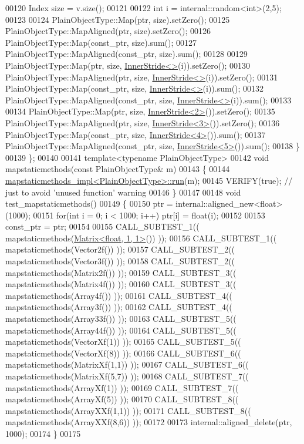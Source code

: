 \begin{DoxyCode}
00120     Index size = v.size();
00121 
00122     \textcolor{keywordtype}{int} i = internal::random<int>(2,5);
00123 
00124     PlainObjectType::Map(ptr, size).setZero();
00125     PlainObjectType::MapAligned(ptr, size).setZero();
00126     PlainObjectType::Map(const\_ptr, size).sum();
00127     PlainObjectType::MapAligned(const\_ptr, size).sum();
00128 
00129     PlainObjectType::Map(ptr, size, \hyperlink{class_eigen_1_1_inner_stride}{InnerStride<>}(i)).setZero();
00130     PlainObjectType::MapAligned(ptr, size, \hyperlink{class_eigen_1_1_inner_stride}{InnerStride<>}(i)).setZero();
00131     PlainObjectType::Map(const\_ptr, size, \hyperlink{class_eigen_1_1_inner_stride}{InnerStride<>}(i)).sum();
00132     PlainObjectType::MapAligned(const\_ptr, size, \hyperlink{class_eigen_1_1_inner_stride}{InnerStride<>}(i)).sum();
00133 
00134     PlainObjectType::Map(ptr, size, \hyperlink{class_eigen_1_1_inner_stride}{InnerStride<2>}()).setZero();
00135     PlainObjectType::MapAligned(ptr, size, \hyperlink{class_eigen_1_1_inner_stride}{InnerStride<3>}()).setZero();
00136     PlainObjectType::Map(const\_ptr, size, \hyperlink{class_eigen_1_1_inner_stride}{InnerStride<4>}()).sum();
00137     PlainObjectType::MapAligned(const\_ptr, size, \hyperlink{class_eigen_1_1_inner_stride}{InnerStride<5>}()).sum();
00138   \}
00139 \};
00140 
00141 \textcolor{keyword}{template}<\textcolor{keyword}{typename} PlainObjectType>
00142 \textcolor{keywordtype}{void} mapstaticmethods(\textcolor{keyword}{const} PlainObjectType& m)
00143 \{
00144   \hyperlink{structmapstaticmethods__impl}{mapstaticmethods\_impl<PlainObjectType>::run}(m);
00145   VERIFY(\textcolor{keyword}{true}); \textcolor{comment}{// just to avoid 'unused function' warning}
00146 \}
00147 
00148 \textcolor{keywordtype}{void} test\_mapstaticmethods()
00149 \{
00150   ptr = internal::aligned\_new<float>(1000);
00151   \textcolor{keywordflow}{for}(\textcolor{keywordtype}{int} i = 0; i < 1000; i++) ptr[i] = \textcolor{keywordtype}{float}(i);
00152 
00153   const\_ptr = ptr;
00154 
00155   CALL\_SUBTEST\_1(( mapstaticmethods(\hyperlink{group___core___module_class_eigen_1_1_matrix}{Matrix<float, 1, 1>}()) ));
00156   CALL\_SUBTEST\_1(( mapstaticmethods(Vector2f()) ));
00157   CALL\_SUBTEST\_2(( mapstaticmethods(Vector3f()) ));
00158   CALL\_SUBTEST\_2(( mapstaticmethods(Matrix2f()) ));
00159   CALL\_SUBTEST\_3(( mapstaticmethods(Matrix4f()) ));
00160   CALL\_SUBTEST\_3(( mapstaticmethods(Array4f()) ));
00161   CALL\_SUBTEST\_4(( mapstaticmethods(Array3f()) ));
00162   CALL\_SUBTEST\_4(( mapstaticmethods(Array33f()) ));
00163   CALL\_SUBTEST\_5(( mapstaticmethods(Array44f()) ));
00164   CALL\_SUBTEST\_5(( mapstaticmethods(VectorXf(1)) ));
00165   CALL\_SUBTEST\_5(( mapstaticmethods(VectorXf(8)) ));
00166   CALL\_SUBTEST\_6(( mapstaticmethods(MatrixXf(1,1)) ));
00167   CALL\_SUBTEST\_6(( mapstaticmethods(MatrixXf(5,7)) ));
00168   CALL\_SUBTEST\_7(( mapstaticmethods(ArrayXf(1)) ));
00169   CALL\_SUBTEST\_7(( mapstaticmethods(ArrayXf(5)) ));
00170   CALL\_SUBTEST\_8(( mapstaticmethods(ArrayXXf(1,1)) ));
00171   CALL\_SUBTEST\_8(( mapstaticmethods(ArrayXXf(8,6)) ));
00172 
00173   internal::aligned\_delete(ptr, 1000);
00174 \}
00175 
\end{DoxyCode}
